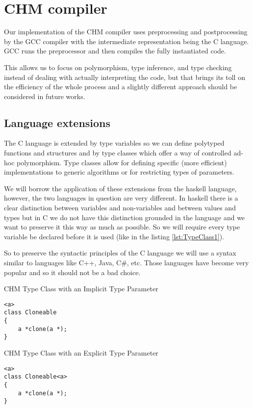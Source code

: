 \chapter{CHM compiler}

Our implementation of the CHM compiler uses preprocessing and postprocessing by the GCC compiler with the intermediate representation being the C language. GCC runs the preprocessor and then compiles the fully instantiated code.

This allows us to focus on polymorphism, type inference, and type checking instead of dealing with actually interpreting the code, but that brings its toll on the efficiency of the whole process and a slightly different approach should be considered in future works.

\section{Language extensions}

The C language is extended by type variables so we can define polytyped functions and structures and by type classes which offer a way of controlled ad-hoc polymorphism. Type classes allow for defining specific (more efficient) implementations to generic algorithms or for restricting types of parameters.

We will borrow the application of these extensions from the haskell language, however, the two languages in question are very different. In haskell there is a clear distinction between variables and non-variables and between values and types but in C we do not have this distinction grounded in the language and we want to preserve it this way as much as possible. So we will require every type variable be declared before it is used (like in the listing \ref{lst:TypeClass1}).

So to preserve the syntactic principles of the C language we will use a syntax similar to languages like C++, Java, C\#, etc. Those languages have become very popular and so it should not be a bad choice.

\begin{listing}
\caption{CHM Type Class with an Implicit Type Parameter}
\label{lst:TypeClass1}
\begin{lstlisting}
<a>
class Cloneable
{
    a *clone(a *);
}
\end{lstlisting}
\end{listing}

\begin{listing}
\caption{CHM Type Class with an Explicit Type Parameter}
\label{lst:TypeClass2}
\begin{lstlisting}
<a>
class Cloneable<a>
{
    a *clone(a *);
}
\end{lstlisting}
\end{listing}

